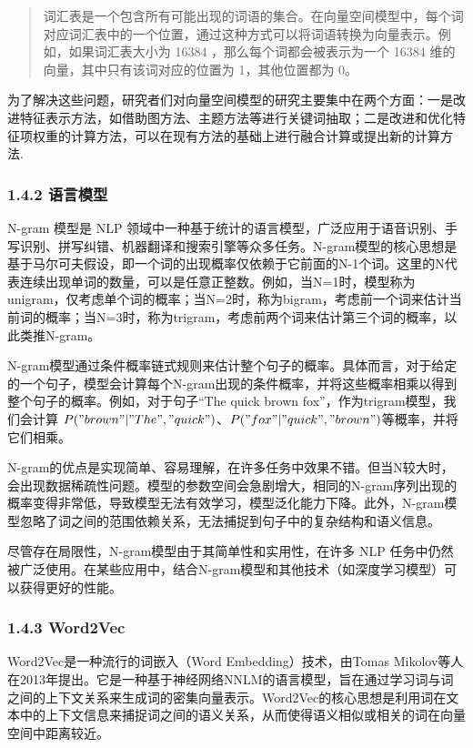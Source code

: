 \documentclass[12pt,a4paper]{book}
\begin{document}
\begin{quote}
词汇表是一个包含所有可能出现的词语的集合。在向量空间模型中，每个词对应词汇表中的一个位置，通过这种方式可以将词语转换为向量表示。例如，如果词汇表大小为
16384 ，那么每个词都会被表示为一个 16384
维的向量，其中只有该词对应的位置为 1，其他位置都为 0。
\end{quote}

为了解决这些问题，研究者们对向量空间模型的研究主要集中在两个方面：一是改进特征表示方法，如借助图方法、主题方法等进行关键词抽取；二是改进和优化特征项权重的计算方法，可以在现有方法的基础上进行融合计算或提出新的计算方法.

\subsubsection{1.4.2 语言模型}\label{ux8bedux8a00ux6a21ux578b}

N-gram 模型是 NLP
领域中一种基于统计的语言模型，广泛应用于语音识别、手写识别、拼写纠错、机器翻译和搜索引擎等众多任务。N-gram模型的核心思想是基于马尔可夫假设，即一个词的出现概率仅依赖于它前面的N-1个词。这里的N代表连续出现单词的数量，可以是任意正整数。例如，当N=1时，模型称为unigram，仅考虑单个词的概率；当N=2时，称为bigram，考虑前一个词来估计当前词的概率；当N=3时，称为trigram，考虑前两个词来估计第三个词的概率，以此类推N-gram。

N-gram模型通过条件概率链式规则来估计整个句子的概率。具体而言，对于给定的一个句子，模型会计算每个N-gram出现的条件概率，并将这些概率相乘以得到整个句子的概率。例如，对于句子``The
quick brown fox''，作为trigram模型，我们会计算
\(P("brown" | "The", "quick")\)、\(P("fox" | "quick", "brown")\)等概率，并将它们相乘。

N-gram的优点是实现简单、容易理解，在许多任务中效果不错。但当N较大时，会出现数据稀疏性问题。模型的参数空间会急剧增大，相同的N-gram序列出现的概率变得非常低，导致模型无法有效学习，模型泛化能力下降。此外，N-gram模型忽略了词之间的范围依赖关系，无法捕捉到句子中的复杂结构和语义信息。

尽管存在局限性，N-gram模型由于其简单性和实用性，在许多 NLP
任务中仍然被广泛使用。在某些应用中，结合N-gram模型和其他技术（如深度学习模型）可以获得更好的性能。

\subsubsection{1.4.3 Word2Vec}\label{word2vec}

Word2Vec是一种流行的词嵌入（Word Embedding）技术，由Tomas
Mikolov等人在2013年提出。它是一种基于神经网络NNLM的语言模型，旨在通过学习词与词之间的上下文关系来生成词的密集向量表示。Word2Vec的核心思想是利用词在文本中的上下文信息来捕捉词之间的语义关系，从而使得语义相似或相关的词在向量空间中距离较近。
\end{document}
